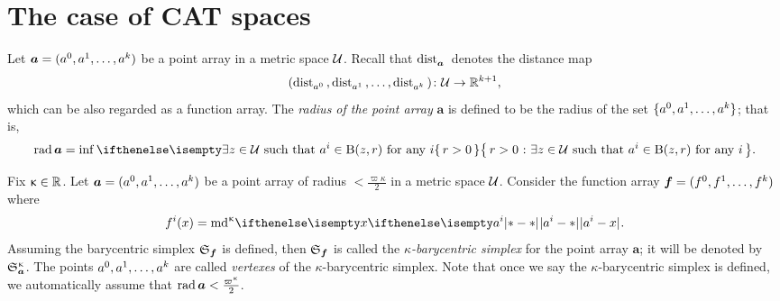 \section{The case of CAT spaces}

Let $\bm{a}=(a^0,a^1,\dots,a^\kay)$ be a point array in a metric space $\mathcal{U}$.
Recall that 
$\mathop{\rm dist}\nolimits_{\bm{a}}^{{}}{}{}$
denotes the distance map
\[(\distfun{a^0}{}{},\distfun{a^1}{}{},\dots,\distfun{a^\kay}{}{})\:\spc{U}\to\RR^{\kay+1},\]
which can be also regarded as a function array.
The \emph{radius of the point array} $\bm{a}$ is defined to be the radius of the set $\{a^0,a^1,\dots,a^\kay\}$;
that is,
\[\rad\bm{a}=\inf\set{r>0}{\exists z\in\spc{U}\ \text{such that}\ a^i\in \oBall(z,r)\ \text{for any}\ i}.\]

Fix $\kappa\in\RR$.
Let $\bm{a}=(a^0,a^1,\dots,a^\kay)$ be a point array of radius $<\tfrac{\varpi\kappa}2$
in a metric space $\mathcal{U}$.
Consider the function array $\bm{f}=(f^0,f^1,\dots,f^\kay)$ 
where 
\[f^i(x)\z=\md\kappa\dist[{{}}]{a^i}{x}{}.\]
Assuming the barycentric simplex $\mathfrak{S}_{\bm{f}}$ is defined,
then $\mathfrak{S}_{\bm{f}}$ is called the \emph{$\kappa$-barycentric simplex} for the point array $\bm{a}$;
it will be denoted by $\mathfrak{S}_{\bm{a}}^{\upkappa}$.
The points $a^0,a^1,\dots,a^\kay$ are called 
\emph{vertexes} of the $\kappa$-barycentric simplex.
Note that once we say the $\kappa$-barycentric simplex is defined, 
we automatically assume that $\rad\bm{a}<\tfrac{\varpi\kappa}2$.


